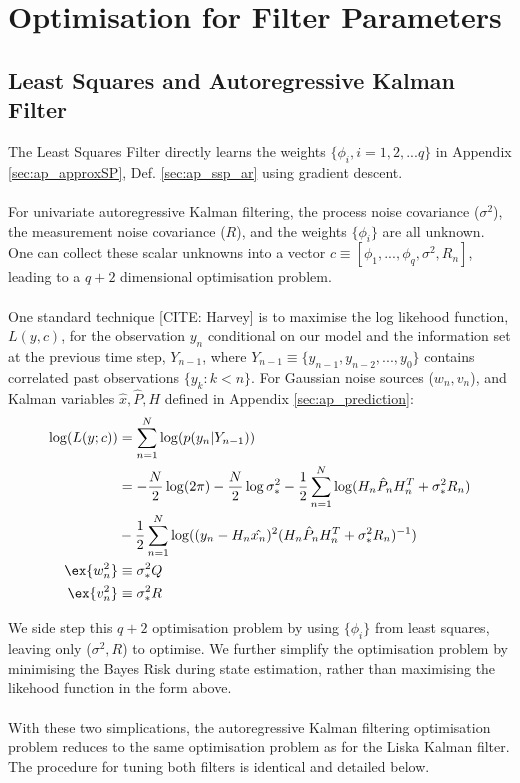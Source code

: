 \section{Optimisation for Filter Parameters} \label{sec:ap_opt}

\subsection{Least Squares and Autoregressive Kalman Filter}
 
The Least Squares Filter directly learns the weights $\{\phi_i, i = 1, 2,...q\}$ in Appendix \ref{sec:ap_approxSP}, Def. \ref{sec:ap_ssp_ar} using gradient descent. 
\\
\\
For univariate autoregressive Kalman filtering, the process noise covariance ($\sigma^2$), the measurement noise covariance ($R$), and the weights $\{\phi_i\}$ are all unknown.  One can collect these scalar unknowns into a vector $c \equiv [\phi_1, ..., \phi_q, \sigma^2, R_n]$, leading to a $q+2$ dimensional optimisation problem.
\\
\\ 
One standard technique [CITE: Harvey] is to maximise the log likehood function, $L(y, c)$, for the observation $y_n$ conditional on our model and the information set at the previous time step, $Y_{n-1}$, where $Y_{n-1} \equiv \{y_{n-1}, y_{n-2}, ..., y_{0}\}$ contains correlated past observations $\{y_k: k< n\}$. For Gaussian noise sources ($w_n, v_n$), and Kalman variables $\hat{x}, \hat{P}, H$ defined in Appendix \ref{sec:ap_prediction}:
\begin{align} 
\log(L(y;c)) & = \sum_{n=1}^N \log(p(y_n | Y_{n-1})) \\
& = -\frac{N}{2} \log(2\pi) - \frac{N}{2}\log{ \sigma^2_*} - \frac{1}{2} \sum_{n=1}^N \log(H_n\hat{P}_{n}H_n^T + \sigma^2_*R_n) \\ 
& - \frac{1}{2} \sum_{n=1}^N \log((y_n - H_n\hat{x_n})^2(H_n\hat{P}_{n}H_n^T + \sigma^2_*R_n)^{-1}) \\
\ex{w_n^2} & \equiv \sigma^2_*Q \\
\ex{v_n^2} & \equiv \sigma^2_*R 
\end{align}

We side step this $q+2$ optimisation problem by using $\{\phi_i\}$ from least squares, leaving only ($\sigma^2, R$) to optimise. We further simplify the optimisation problem by minimising the Bayes Risk during state estimation, rather than maximising the likehood function in the form above.
\\
\\
With these two simplications, the autoregressive Kalman filtering optimisation problem reduces to the same optimisation problem as for the Liska Kalman filter. The procedure for tuning both filters is identical and detailed below.

